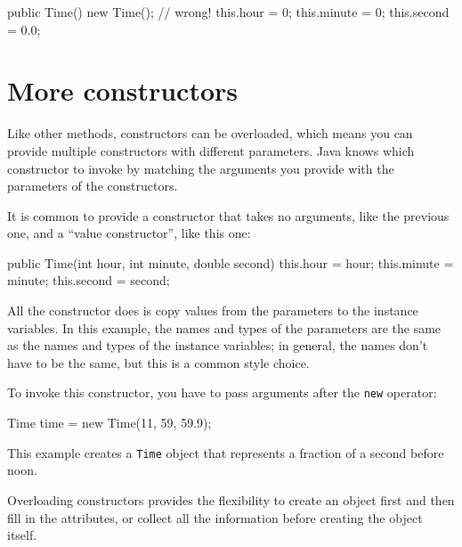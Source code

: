 \documentclass[12pt]{book}
\theoremstyle{exercise}
\newcommand{\java}[1]{\verb"#1"}
\begin{document}
\begin{code}
    public Time() {
        new Time();        // wrong!
        this.hour = 0;
        this.minute = 0;
        this.second = 0.0;
    }
\end{code}


\section{More constructors}


Like other methods, constructors can be overloaded, which means you can provide multiple constructors with different parameters.
Java knows which constructor to invoke by matching the arguments you provide with the parameters of the constructors.



It is common to provide a constructor that takes no arguments, like the previous one, and a ``value constructor'', like this one:

\begin{code}
    public Time(int hour, int minute, double second) {
        this.hour = hour;
        this.minute = minute;
        this.second = second;
    }
\end{code}

All the constructor does is copy values from the parameters to the instance variables.
In this example, the names and types of the parameters are the same as the names and types of the instance variables; in general, the names don't have to be the same, but this is a common style choice. 

To invoke this constructor, you have to pass arguments after the \java{new} operator:

\begin{code}
    Time time = new Time(11, 59, 59.9);
\end{code}

This example creates a \java{Time} object that represents a fraction of a second before noon.

Overloading constructors provides the flexibility to create an object first and then fill in the attributes, or collect all the information before creating the object itself.
\end{document}
